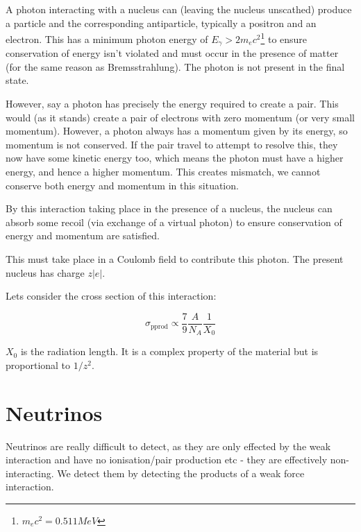 \begin{center}
\end{center}

A photon interacting with a nucleus can (leaving the nucleus unscathed) produce a particle and the corresponding antiparticle, typically a positron and an electron. This has a minimum photon energy of $E_\gamma > 2m_e c^2$\footnote{$m_ec^2 = 0.511 \si{MeV}$} to ensure conservation of energy isn't violated and must occur in the presence of matter (for the same reason as Bremsstrahlung). The photon is not present in the final state.

However, say a photon has precisely the energy required to create a pair. This would (as it stands) create a pair of electrons with zero momentum (or very small momentum). However, a photon always has a momentum given by its energy, so momentum is not conserved. If the pair travel to attempt to resolve this, they now have some kinetic energy too, which means the photon must have a higher energy, and hence a higher momentum. This creates mismatch, we cannot conserve both energy and momentum in this situation.

By this interaction taking place in the presence of a nucleus, the nucleus can absorb some recoil (via exchange of a virtual photon) to ensure conservation of energy and momentum are satisfied.

This must take place in a Coulomb field to contribute this photon. The present nucleus has charge $z|e|$.

Lets consider the cross section of this interaction:

\[
    \sigma_\text{pprod} \propto \frac{7}{9}\frac{A}{N_A} \frac{1}{X_0}
\]

$X_0$ is the radiation length. It is a complex property of the material but is proportional to $1/z^2$.

\section{Neutrinos}
Neutrinos are really difficult to detect, as they are only effected by the weak interaction and have no ionisation/pair production etc - they are effectively non-interacting. We detect them by detecting the products of a weak force interaction.

